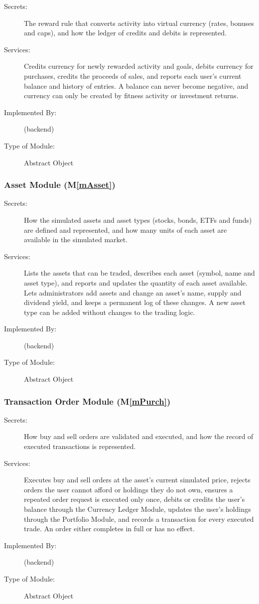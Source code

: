 \documentclass[12pt, titlepage]{article}
\newcommand{\mref}[1]{M\ref{#1}}
\begin{document}
\begin{description}
\item[Secrets:] The reward rule that converts activity into virtual currency
  (rates, bonuses and caps), and how the ledger of credits and debits is
  represented.
\item[Services:] Credits currency for newly rewarded activity and goals, debits
  currency for purchases, credits the proceeds of sales, and reports each
  user's current balance and history of entries. A balance can never become
  negative, and currency can only be created by fitness activity or investment
  returns.
\item[Implemented By:] \progname{} (backend)
\item[Type of Module:] Abstract Object
\end{description}

\subsubsection{Asset Module (\mref{mAsset})}

\begin{description}
\item[Secrets:] How the simulated assets and asset types (stocks, bonds, ETFs
  and funds) are defined and represented, and how many units of each asset are
  available in the simulated market.
\item[Services:] Lists the assets that can be traded, describes each asset
  (symbol, name and asset type), and reports and updates the quantity of each
  asset available. Lets administrators add assets and change an asset's name,
  supply and dividend yield, and keeps a permanent log of these changes. A new
  asset type can be added without changes to the trading logic.
\item[Implemented By:] \progname{} (backend)
\item[Type of Module:] Abstract Object
\end{description}

\subsubsection{Transaction Order Module (\mref{mPurch})}

\begin{description}
\item[Secrets:] How buy and sell orders are validated and executed, and how the
  record of executed transactions is represented.
\item[Services:] Executes buy and sell orders at the asset's current simulated
  price, rejects orders the user cannot afford or holdings they do not own,
  ensures a repeated order request is executed only once, debits or credits the
  user's balance through the Currency Ledger Module, updates the user's
  holdings through the Portfolio Module, and records a transaction for every
  executed trade. An order either completes in full or has no effect.
\item[Implemented By:] \progname{} (backend)
\item[Type of Module:] Abstract Object
\end{description}
\end{document}
